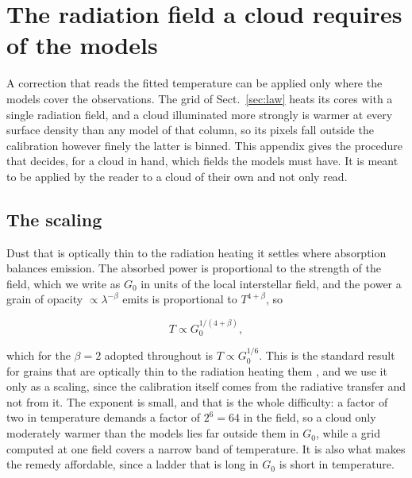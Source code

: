 
\section{The radiation field a cloud requires of the models}
\label{app:field}

A correction that reads the fitted temperature can be applied only where the models cover the observations.  The grid of
Sect.~\ref{sec:law} heats its cores with a single radiation field, and a cloud illuminated more strongly is warmer at every
surface density than any model of that column, so its pixels fall outside the calibration however finely the latter is binned.
This appendix gives the procedure that decides, for a cloud in hand, which fields the models must have.  It is meant to be applied
by the reader to a cloud of their own and not only read.

\subsection{The scaling}
\label{app:field:scaling}

Dust that is optically thin to the radiation heating it settles where absorption balances emission.  The absorbed power is
proportional to the strength of the field, which we write as $G_0$ in units of the local interstellar field, and the power a grain
of opacity $\propto \lambda^{-\beta}$ emits is proportional to $T^{4+\beta}$, so

\begin{equation}
   T \propto G_0^{1/(4+\beta)} ,
\label{eq:g0scaling}
\end{equation}

which for the $\beta = 2$ adopted throughout is $T \propto G_0^{1/6}$.  This is the standard result for grains that are optically
thin to the radiation heating them \citep{IvezicElitzur1997, Tielens2005}, and we use it only as a scaling, since the calibration
itself comes from the radiative transfer and not from it.  The exponent is small, and that is the whole difficulty: a factor of
two in temperature demands a factor of $2^6 = 64$ in the field, so a cloud only moderately warmer than the models lies far
outside them in $G_0$, while a grid computed at one field covers a narrow band of temperature.  It is also what makes the remedy
affordable, since a ladder that is long in $G_0$ is short in temperature.


